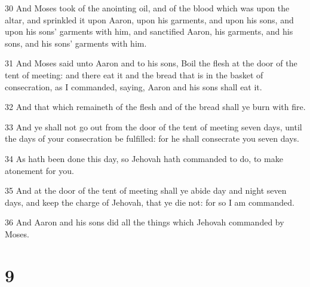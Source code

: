 \par 30 And Moses took of the anointing oil, and of the blood which was upon the altar, and sprinkled it upon Aaron, upon his garments, and upon his sons, and upon his sons' garments with him, and sanctified Aaron, his garments, and his sons, and his sons' garments with him.
\par 31 And Moses said unto Aaron and to his sons, Boil the flesh at the door of the tent of meeting: and there eat it and the bread that is in the basket of consecration, as I commanded, saying, Aaron and his sons shall eat it.
\par 32 And that which remaineth of the flesh and of the bread shall ye burn with fire.
\par 33 And ye shall not go out from the door of the tent of meeting seven days, until the days of your consecration be fulfilled: for he shall consecrate you seven days.
\par 34 As hath been done this day, so Jehovah hath commanded to do, to make atonement for you.
\par 35 And at the door of the tent of meeting shall ye abide day and night seven days, and keep the charge of Jehovah, that ye die not: for so I am commanded.
\par 36 And Aaron and his sons did all the things which Jehovah commanded by Moses.

\chapter{9}


